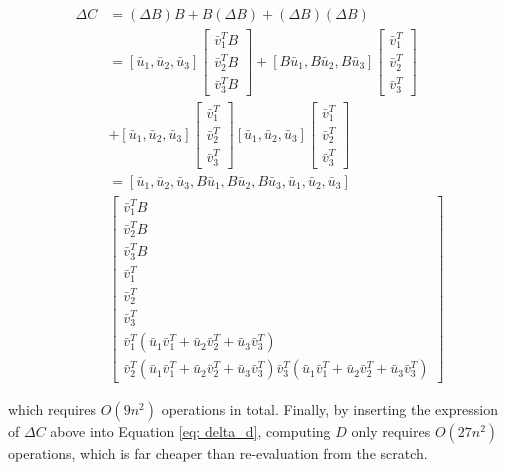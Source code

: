 \begin{equation}
\begin{split}
    \Delta C &= (\Delta B) B + B (\Delta B) + (\Delta B) (\Delta B) \\&=[\bar{u}_1, \bar{u}_2, \bar{u}_3]
\begin{bmatrix}
    \bar{v}^T_1B \\
    \bar{v}^T_2B \\
    \bar{v}^T_3B 
\end{bmatrix}+[B\bar{u}_1, B\bar{u}_2, B\bar{u}_3]
\begin{bmatrix}
    \bar{v}^T_1 \\
    \bar{v}^T_2 \\
    \bar{v}^T_3 
\end{bmatrix}\\
&+[\bar{u}_1, \bar{u}_2, \bar{u}_3]
\begin{bmatrix}
    \bar{v}^T_1  \\
    \bar{v}^T_2  \\
    \bar{v}^T_3  
\end{bmatrix}
[\bar{u}_1, \bar{u}_2, \bar{u}_3]
\begin{bmatrix}
    \bar{v}^T_1  \\
    \bar{v}^T_2  \\
    \bar{v}^T_3  
\end{bmatrix}\\
&=[\bar{u}_1, \bar{u}_2, \bar{u}_3, B\bar{u}_1, B\bar{u}_2, B\bar{u}_3, \bar{u}_1, \bar{u}_2, \bar{u}_3]\\
&\begin{bmatrix}
    \bar{v}^T_1B \\
    \bar{v}^T_2B \\
    \bar{v}^T_3B \\
    \bar{v}^T_1  \\
    \bar{v}^T_2  \\
    \bar{v}^T_3  \\
    \bar{v}^T_1(\bar{u}_1\bar{v}^T_1 + \bar{u}_2\bar{v}^T_2 + \bar{u}_3\bar{v}^T_3)\\
    \bar{v}^T_2(\bar{u}_1\bar{v}^T_1 + \bar{u}_2\bar{v}^T_2 + \bar{u}_3\bar{v}^T_3)
    \bar{v}^T_3(\bar{u}_1\bar{v}^T_1 + \bar{u}_2\bar{v}^T_2 + \bar{u}_3\bar{v}^T_3)
\end{bmatrix}
\end{split}
\end{equation}

which requires $O(9n^2)$ operations in total. Finally, by inserting the expression of $\Delta C$ above into Equation \ref{eq: delta_d}, computing $D$ only requires $O(27n^2)$ operations, which is far cheaper than re-evaluation from the scratch.

